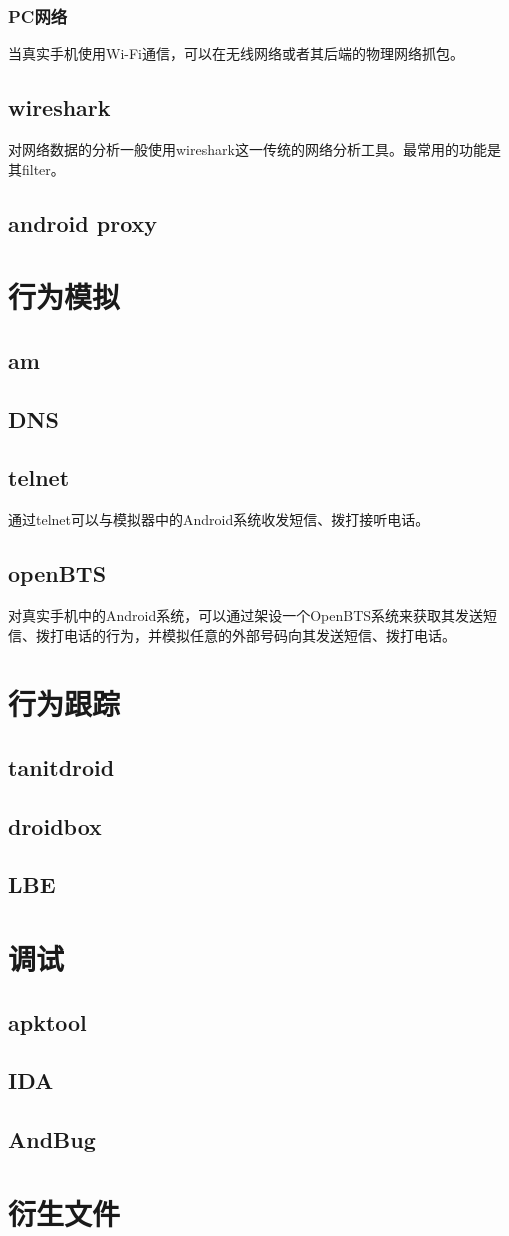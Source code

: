 \subsubsection{PC网络}
当真实手机使用Wi-Fi通信，可以在无线网络或者其后端的物理网络抓包。
\subsection{wireshark}
对网络数据的分析一般使用wireshark这一传统的网络分析工具。最常用的功能是其filter。

\subsection{android proxy}
\section{行为模拟}
\subsection{am}

\subsection{DNS}

\subsection{telnet}
通过telnet可以与模拟器中的Android系统收发短信、拨打接听电话。
\subsection{openBTS}
对真实手机中的Android系统，可以通过架设一个OpenBTS系统来获取其发送短信、拨打电话的行为，并模拟任意的外部号码向其发送短信、拨打电话。

\section{行为跟踪}
\subsection{tanitdroid}
\subsection{droidbox}
\subsection{LBE}

\section{调试}
\label{Sec:debug}
\subsection{apktool}
\subsection{IDA}
\subsection{AndBug}
\section{衍生文件}
